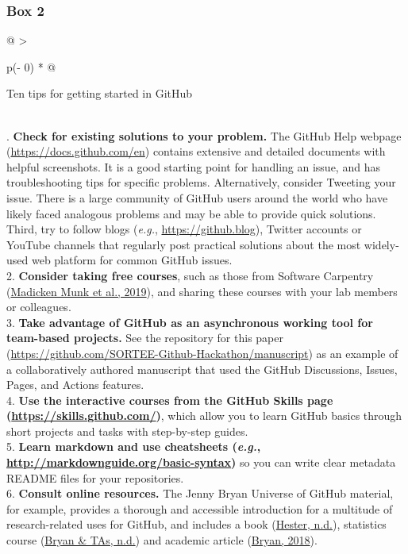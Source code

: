 \hypertarget{tips}{%
\subsubsection{Box 2}\label{tips}}

\begin{tablenos:no-prefix-table-caption}

\begin{longtable}[]{@{}
  >{\raggedright\arraybackslash}p{(\columnwidth - 0\tabcolsep) * }@{}}
\toprule
\begin{minipage}[b]{\linewidth}\raggedright
Ten tips for getting started in GitHub
\end{minipage} \\
\midrule
{}. \textbf{Check for existing solutions to your problem.} The GitHub Help webpage (\url{https://docs.github.com/en}) contains extensive and detailed documents with helpful screenshots. It is a good starting point for handling an issue, and has troubleshooting tips for specific problems. Alternatively, consider Tweeting your issue. There is a large community of GitHub users around the world who have likely faced analogous problems and may be able to provide quick solutions. Third, try to follow blogs (\emph{e.g.}, \url{https://github.blog}), Twitter accounts or YouTube channels that regularly post practical solutions about the most widely-used web platform for common GitHub issues. \\
2. \textbf{Consider taking free courses}, such as those from Software Carpentry (\protect\hyperlink{ref-pjy75gHr}{Madicken Munk et al., 2019}), and sharing these courses with your lab members or colleagues. \\
3. \textbf{Take advantage of GitHub as an asynchronous working tool for team-based projects.} See the repository for this paper (\url{https://github.com/SORTEE-Github-Hackathon/manuscript}) as an example of a collaboratively authored manuscript that used the GitHub Discussions, Issues, Pages, and Actions features. \\
4. \textbf{Use the interactive courses from the GitHub Skills page (\url{https://skills.github.com/})}, which allow you to learn GitHub basics through short projects and tasks with step-by-step guides. \\
5. \textbf{Learn markdown and use cheatsheets (\emph{e.g.}, \url{http://markdownguide.org/basic-syntax})} so you can write clear metadata README files for your repositories. \\
6. \textbf{Consult online resources.} The Jenny Bryan Universe of GitHub material, for example, provides a thorough and accessible introduction for a multitude of research-related uses for GitHub, and includes a book (\protect\hyperlink{ref-ZvrOcg9w}{Hester, n.d.}), statistics course (\protect\hyperlink{ref-6CMMeSeD}{Bryan \& TAs, n.d.}) and academic article (\protect\hyperlink{ref-RVetqmsg}{Bryan, 2018}). \\

\end{longtable}
\end{tablenos:no-prefix-table-caption}
